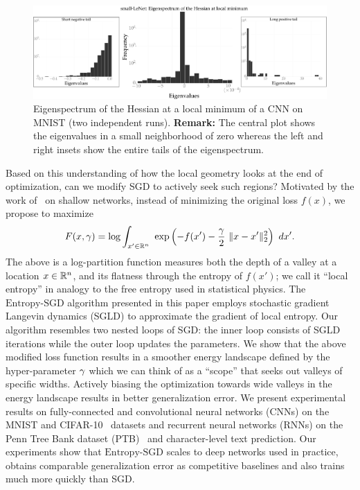 \documentclass[10pt]{article}
\newcommand{\entropysgd}{\mathrm{Entropy}\textrm{-}\mathrm{SGD}}
\begin{document}
\begin{figure}[tbh]
\centering
\includegraphics[width=\textwidth]{lenet_hessian.pdf}
\caption{\small Eigenspectrum of the Hessian at a local minimum of a CNN on MNIST (two independent runs). \textbf{Remark:} The central plot shows the eigenvalues in a small neighborhood of zero whereas the left and right insets show the entire tails of the eigenspectrum.}
\label{fig:lenet_hessian}
\end{figure}

Based on this understanding of how the local geometry looks at the end of optimization, can we modify SGD to actively seek such regions? Motivated by the work of~\citet{baldassi2015subdominant} on shallow networks, instead of minimizing the original loss $f(x)$, we propose to maximize
$$
F(x, \g) = \log \int_{x' \in \reals^n}\ \exp \rbrac{-f(x') - \f{\g}{2}\ \norm{x-x'}^2_2}\ dx'.
$$
The above is a log-partition function measures both the depth of a valley at a location  $x \in \mathbb{R}^n$, and its flatness through the entropy of $f(x')$; we call it ``local entropy'' in analogy to the free entropy used in statistical physics. The $\entropysgd$ algorithm presented in this paper employs stochastic gradient Langevin dynamics (SGLD) to approximate the gradient of local entropy. Our algorithm resembles two nested loops of SGD: the inner loop consists of SGLD iterations while the outer loop updates the parameters. We show that the above modified loss function results in a smoother energy landscape defined by the hyper-parameter $\gamma$ which we can think of as a ``scope'' that seeks out valleys of specific widths. Actively biasing the optimization towards wide valleys in the energy landscape results in better generalization error. We present experimental results on fully-connected and convolutional neural networks (CNNs) on the MNIST and CIFAR-10~\citep{krizhevsky2009learning} datasets and recurrent neural networks (RNNs) on the Penn Tree Bank dataset (PTB)~\citep{marcus1993building} and character-level text prediction. Our experiments show that $\entropysgd$ scales to deep networks used in practice, obtains comparable generalization error as competitive baselines and also trains much more quickly than SGD.
\end{document}
